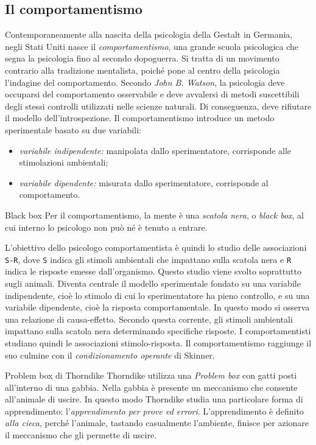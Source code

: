 \documentclass[a4paper]{article}
\begin{document}
\subsection{Il comportamentismo}
Contemporaneamente alla nascita della psicologia della Gestalt in Germania, negli Stati Uniti nasce il \emph{comportamentismo}, una grande scuola psicologica che segna la psicologia fino al secondo dopoguerra. Si tratta di un movimento contrario alla tradizione mentalista, poiché pone al centro della psicologia l'indagine del comportamento.
Secondo \emph{John B. Watson}, la psicologia deve occuparsi del comportamento osservabile e deve avvalersi di metodi suscettibili degli stessi controlli utilizzati nelle scienze naturali. Di conseguenza, deve rifiutare il modello dell'introspezione.
Il comportamentismo introduce un metodo sperimentale basato su due variabili:
\begin{itemize}
    \item \emph{variabile indipendente:} manipolata dallo sperimentatore, corrisponde alle stimolazioni ambientali;
    \item \emph{variabile dipendente:} misurata dallo sperimentatore, corrisponde al comportamento.
\end{itemize}
\begin{snippetdefinition}{Black box}
    Per il comportamentismo, la mente è una \emph{scatola nera}, o \emph{black box}, al cui interno lo psicologo non può né è tenuto a entrare.
\end{snippetdefinition}
L'obiettivo dello psicologo comportamentista è quindi lo studio delle associazioni \texttt{S-R}, dove \texttt{S} indica gli stimoli ambientali che impattano sulla scatola nera e \texttt{R} indica le risposte emesse dall'organismo.
Questo studio viene svolto soprattutto sugli animali. Diventa centrale il modello sperimentale fondato su una variabile indipendente, cioè lo stimolo di cui lo sperimentatore ha pieno controllo, e su una variabile dipendente, cioè la risposta comportamentale. In questo modo si osserva una relazione di causa-effetto.
Secondo questa corrente, gli stimoli ambientali impattano sulla scatola nera determinando specifiche risposte. I comportamentisti studiano quindi le associazioni stimolo-risposta.
Il comportamentismo raggiunge il suo culmine con il \emph{condizionamento operante} di Skinner.
\begin{snippetexample}{Problem box di Thorndike}
    Thorndike utilizza una \emph{Problem box} con gatti posti all'interno di una gabbia. Nella gabbia è presente un meccanismo che consente all'animale di uscire. In questo modo Thorndike studia una particolare forma di apprendimento: l'\emph{apprendimento per prove ed errori}. L'apprendimento è definito \emph{alla cieca}, perché l'animale, tastando casualmente l'ambiente, finisce per azionare il meccanismo che gli permette di uscire.
\end{snippetexample}
\end{document}
